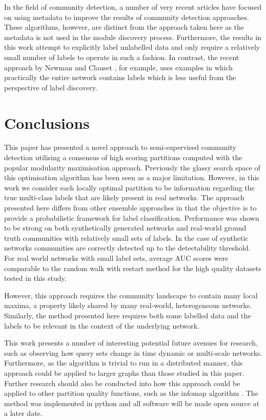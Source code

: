 \documentclass[sigconf]{acmart}
\begin{document}
In the field of community detection, a number of very recent articles have focused on using metadata to improve the results of community detection approaches.
These algorithms, however, are distinct from the approach taken here as the metadata is not used in the module discovery process.
Furthermore, the results in this work attempt to explicitly label unlabelled data and only require a relatively small number of labels to operate in such a fashion.
In contrast,  the recent approach by Newman and Clauset \cite{newman2016structure}, for example, uses examples in which practically the entire network contains labels which is less useful from the perspective of label discovery.

\section{Conclusions}
This paper has presented a novel approach to semi-supervised community detection utilising a consensus of high scoring partitions computed with the popular modularity maximisation approach.
Previously the glassy search space of this optimisation algorithm has been seen as a major limitation.
However, in this work we consider each locally optimal partition to be information regarding the true multi-class labels that are likely present in real networks.
The approach presented here differs from other ensemble approaches in that the objective is to provide a probabilistic framework for label classification.
Performance was shown to be strong on both synthetically generated networks and real-world ground truth communities with relatively small sets of labels.
In the case of synthetic networks communities are correctly detected up to the detectability threshold.
For real world networks with small label sets, average AUC scores were comparable to the random walk with restart method for the high quality datasets tested in this study.

However, this approach requires the community landscape to contain many local maxima, a property likely shared by many real-world, heterogeneous networks.
Similarly, the method presented here requires both some labelled data and the labels to be relevant in the context of the underlying network.

This work presents a number of interesting potential future avenues for research, such as observing how query sets change in time dynamic or multi-scale networks.
Furthermore, as the algorithm is trivial to run in a distributed manner, this approach could be applied to larger graphs than those studied in this paper.
Further research should also be conducted into how this approach could be applied to other partition quality functions, such as the infomap algorithm \cite{Rosvall:2008fi}.
The method was implemented in python and all software will be made open source at a later date.
\end{document}
